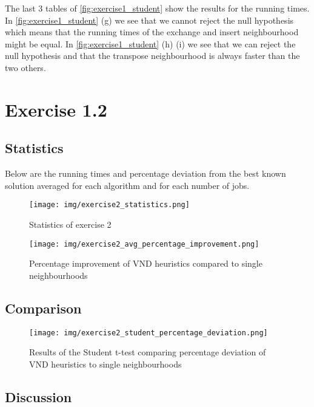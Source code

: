 \documentclass[a4paper,10pt]{article}
\begin{document}
The last 3 tables of \ref{fig:exercise1_student} show the results for the running times. In \ref{fig:exercise1_student} (g) we see that we cannot reject the null hypothesis which means that the running times of the exchange and insert neighbourhood might be equal. In \ref{fig:exercise1_student} (h) (i) we see that we can reject the null hypothesis and that the transpose neighbourhood is always faster than the two others.

\section{Exercise 1.2}

\subsection{Statistics}

Below are the running times and percentage deviation from the best known solution averaged for each algorithm and for each number of jobs.

\begin{figure}[H]
	\centering
	\caption{Statistics of exercise 2}
	\texttt{[image: img/exercise2\_statistics.png]}
\end{figure}


\begin{figure}[H]
	\centering
	\caption{Percentage improvement of VND heuristics compared to single neighbourhoods}
	\texttt{[image: img/exercise2\_avg\_percentage\_improvement.png]}
\end{figure}

\subsection{Comparison}

\begin{figure}[H]
	\centering
	\caption{Results of the Student t-test comparing percentage deviation of VND heuristics to single neighbourhoods}
	\texttt{[image: img/exercise2\_student\_percentage\_deviation.png]}
\end{figure}

\subsection{Discussion}
\end{document}
